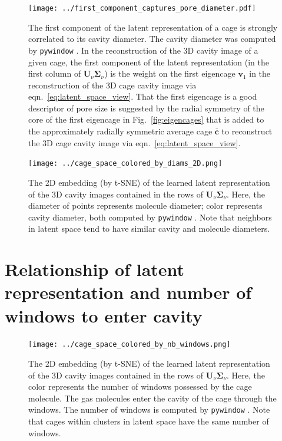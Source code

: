 \documentclass[journal=jacsat,manuscript=article]{achemso}
\begin{document}
\begin{figure}
\centering
	\texttt{[image: ../first\_component\_captures\_pore\_diameter.pdf]}
	\caption{The first component of the latent representation of a cage is strongly correlated to its cavity diameter. The cavity diameter was computed by \texttt{pywindow} \cite{miklitz2018pywindow}. In the reconstruction of the 3D cavity image of a given cage, the first component of the latent representation (in the first column of $\mathbf{U}_\nu \mathbf{\Sigma}_\nu$) is the weight on the first eigencage $\mathbf{v}_1$ in the reconstruction of the 3D cage cavity image via eqn.~\ref{eq:latent_space_view}. That the first eigencage is a good descriptor of pore size is suggested by the radial symmetry of the core of the first eigencage in Fig.~\ref{fig:eigencages} that is added to the approximately radially symmetric average cage $\bar{\mathbf{c}}$ to reconstruct the 3D cage cavity image via eqn.~\ref{eq:latent_space_view}.
	} \label{fig:first_component_captures_pore_diameter}
\end{figure}


\begin{figure}
\centering
	\texttt{[image: ../cage\_space\_colored\_by\_diams\_2D.png]}
	\caption{The 2D embedding (by t-SNE) of the learned latent representation of the 3D cavity images contained in the rows of $\mathbf{U}_\nu \mathbf{\Sigma}_\nu$. Here, the diameter of points represents molecule diameter; color represents cavity diameter, both computed by \texttt{pywindow} \cite{miklitz2018pywindow}. Note that neighbors in latent space tend to have similar cavity and molecule diameters.
	} \label{fig:cage_space_colored_by_diams_2D}
\end{figure}

\newpage
\clearpage

\section{Relationship of latent representation and number of windows to enter cavity}

\begin{figure}
\centering
	\texttt{[image: ../cage\_space\_colored\_by\_nb\_windows.png]}
	\caption{The 2D embedding (by t-SNE) of the learned latent representation of the 3D cavity images contained in the rows of $\mathbf{U}_\nu \mathbf{\Sigma}_\nu$. Here, the color represents the number of windows possessed by the cage molecule. The gas molecules enter the cavity of the cage through the windows. The number of windows is computed by \texttt{pywindow} \cite{miklitz2018pywindow}. Note that cages within clusters in latent space have the same number of windows.
	} \label{fig:cage_space_colored_by_nb_windows}
\end{figure}
\end{document}
